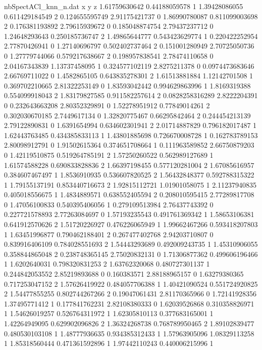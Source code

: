 \begin{filecontents}{nbSpectACl_knn_n.dat}
x y z
1.61759630642 0.44188059578 1
1.39428086055 0.611429184549 2
0.124655595749 2.91175421737 0
1.86990780087 0.811099003698 2
0.176381193892 2.79615939672 0
0.185048874754 2.79437237712 0
1.24648293643 0.250185736747 2
1.49865644777 0.543423629774 1
0.220422252954 2.77870426941 0
1.27140696797 0.502402737464 2
0.151001280949 2.70725050736 0
1.27779744066 0.579217638667 2
0.198957838541 2.78474110658 0
2.04167343839 1.13737458095 1
0.324577102119 2.8275211378 0
0.0974473683646 2.66769711022 0
1.4582865105 0.643835278301 2
1.61513881884 1.12142701508 1
0.369702210665 2.81322253149 0
1.83593042442 0.994629863996 1
1.8169319388 0.554099918043 2
1.83179827585 0.911582257614 2
0.0828258316289 2.8222204391 0
0.232643663208 2.80352329891 0
1.52278951912 0.77849014261 2
0.302030670185 2.7449617134 0
1.32820775467 0.66295842464 2
0.244454213139 2.79122890831 0
1.6391654994 0.634602301941 2
2.01714887829 0.796182017487 1
1.62443763485 0.434385833113 1
1.43801885698 0.726670008728 1
0.162783789153 2.80098912791 0
1.91502615364 0.374651708664 1
0.111963589852 2.66750879203 0
1.42119510875 0.519264785191 2
1.57250260522 0.562989127689 1
1.61574588228 0.690833828836 2
1.66397198455 0.577120281004 2
1.67085616957 0.384607467497 1
1.8536910935 0.536607820525 2
1.56432848377 0.592788315322 1
1.79155137191 0.853440716673 2
1.92815112721 1.01901058075 1
2.11237940835 0.405018556675 1
1.4834889571 0.638552405594 2
0.208010595415 2.77289817708 0
1.47056100833 0.540395406056 1
0.279109513984 2.76437743392 0
0.227721578893 2.77263084697 0
1.57193235543 0.491761369342 1
1.58653106381 0.641912570626 2
1.51720226927 0.476226065949 1
1.99662467266 0.593418207803 1
1.63451996877 0.790462188401 2
0.267477402768 2.94203710807 0
0.839916406109 0.784028551693 2
1.54443293689 0.492009243735 1
1.45310906055 0.358844865048 2
0.238748365145 2.75020832131 0
1.71306877362 0.499606196466 1
1.6202640031 0.798320831253 2
1.63762320068 0.480727301137 1
0.244842053552 2.85219893688 0
0.160383571 2.88188965157 0
1.63279380365 0.717253047152 2
1.57626419922 0.484057706388 1
1.40421090524 0.551724920825 2
1.54477855255 0.802744267266 2
0.19047061431 2.81170365966 0
1.72141928356 1.37495771412 1
0.177841762231 2.82108380333 0
1.62039526868 0.310358826971 1
1.54626019257 0.526764311972 1
1.62305810113 0.377683165001 1
1.42264949095 0.629902096826 2
1.36324268738 0.768789950465 2
1.89102839477 0.480530103108 1
1.48777936635 0.934385312433 1
1.57963905096 1.08329113258 1
1.85318560444 0.471361592896 1
1.97442110243 0.440006215996 1

\end{filecontents}
